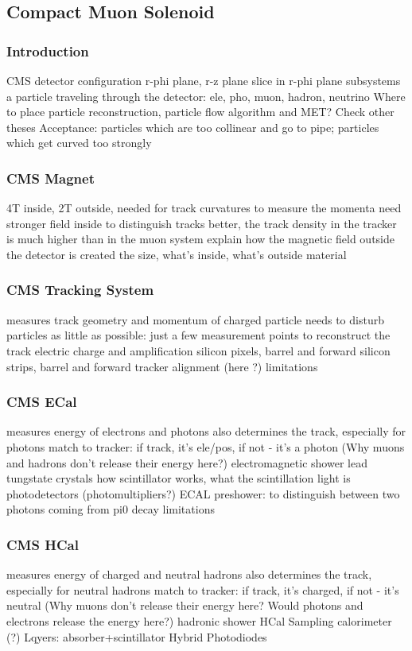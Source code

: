 \subsection{Compact Muon Solenoid}
\label{sec:Exp_CMS}
\subsubsection{Introduction}

CMS detector configuration
r-phi plane, r-z plane
slice in r-phi plane
subsystems
a particle traveling through the detector:
ele, pho, muon, hadron, neutrino
Where to place particle reconstruction, particle flow algorithm and MET? Check other theses
Acceptance: particles which are too collinear and go to pipe; particles which get curved too strongly

\subsubsection{CMS Magnet}
4T inside, 2T outside, needed for track curvatures to measure the momenta
need stronger field inside to distinguish tracks better, the track density in the tracker is much higher than in the muon system
explain how the magnetic field outside the detector is created
the size, what's inside, what's outside
material

\subsubsection{CMS Tracking System}
measures track geometry and momentum of charged particle
needs to disturb particles as little as possible: just a few measurement points to reconstruct the track
electric charge and amplification
silicon pixels, barrel and forward
silicon strips, barrel and forward
tracker alignment (here ?)
limitations

\subsubsection{CMS ECal}
measures energy of electrons and photons
also determines the track, especially for photons
match to tracker: if track, it's ele/pos, if not - it's a photon
(Why muons and hadrons don't release their energy here?)
electromagnetic shower
lead tungstate crystals
how scintillator works, what the scintillation light is
photodetectors (photomultipliers?)
ECAL preshower: to distinguish between two photons coming from pi0 decay
limitations

\subsubsection{CMS HCal}
measures energy of charged and neutral hadrons
also determines the track, especially for neutral hadrons
match to tracker: if track, it's charged, if not - it's neutral
(Why muons don't release their energy here? Would photons and electrons release the energy here?)
hadronic shower
HCal Sampling calorimeter (?)
Lqyers: absorber+scintillator
Hybrid Photodiodes

